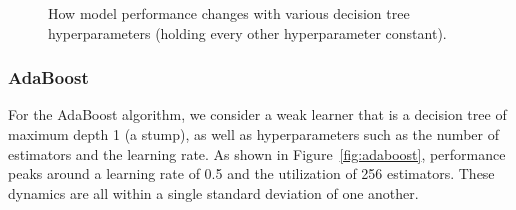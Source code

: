 \documentclass[12pt]{article}
\newtheorem{Proof of Lemma}{Proof of Lemma}
\begin{document}
\begin{figure}[h!]
  \centering
  \caption{How model performance changes with various decision tree hyperparameters (holding every other hyperparameter constant).}
  \label{fig:dtree}
\end{figure}

\subsubsection{AdaBoost}
For the AdaBoost algorithm, we consider a weak learner that is a decision tree of maximum depth 1 (a stump), as well as hyperparameters 
such as the number of estimators and the learning rate. As shown in Figure~\ref{fig:adaboost}, performance peaks around a learning rate of 0.5
and the utilization of 256 estimators. These dynamics are all within a single 
standard deviation of one another. 
\end{document}
